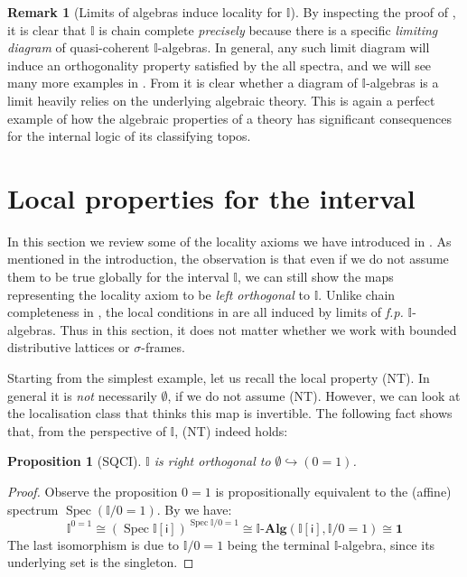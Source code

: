 \documentclass[a4paper,12pt]{amsart}
\newtheorem{proposition}[theorem]{Proposition}
\theoremstyle{definition}
\newtheorem{remark}[theorem]{Remark}
\newcommand{\mb}[1]{\mathbf{#1}}
\newcommand{\mbb}[1]{\mathbb{#1}}
\newcommand{\I}{\mbb I}
\newcommand{\ms}[1]{\mathsf{#1}}
\newcommand{\alg}{\text{-}\mb{Alg}}
\newcommand{\hook}{\hookrightarrow}
\newcommand{\emp}{\emptyset}
\newcommand{\spec}{\operatorname{Spec}}
\begin{document}
\begin{remark}[Limits of algebras induce locality for $\I$]\label{rem:limofalgloc}
  By inspecting the proof of , it is clear that $\I$ is chain complete \emph{precisely} because there is a specific \emph{limiting diagram} of quasi-coherent $\I$-algebras. In general, any such limit diagram will induce an orthogonality property satisfied by the all spectra, and we will see many more examples in . From  it is clear whether a diagram of $\I$-algebras is a limit heavily relies on the underlying algebraic theory. This is again a perfect example of how the algebraic properties of a theory has significant consequences for the internal logic of its classifying topos.
\end{remark}

\section{Local properties for the interval}\label{sec:local}

In this section we review some of the locality axioms we have introduced in . As mentioned in the introduction, the observation is that even if we do not assume them to be true globally for the interval $\I$, we can still show the maps representing the locality axiom to be \emph{left orthogonal} to $\I$.  
Unlike chain completeness in , the local conditions in  are all induced by limits of \emph{f.p.} $\I$-algebras. Thus in this section, it does not matter whether we work with bounded distributive lattices or $\sigma$-frames.

Starting from the simplest example, let us recall the local property (NT). In general it is \emph{not} necessarily $\emp$, if we do not assume (NT). However, we can look at the localisation class that thinks this map is invertible. The following fact shows that, from the perspective of $\I$, (NT) indeed holds:

\begin{proposition}[SQCI]\label{specisnontrivial}
  $\I$ is right orthogonal to $\emp \hook (0 = 1)$.
\end{proposition}
\begin{proof}
  Observe the proposition $0 = 1$ is propositionally equivalent to the (affine) spectrum $\spec(\I/0=1)$. By  we have:
  \[ 
    \I^{0=1} \cong 
    (\spec \I[\ms{i}])^{\spec{\I/0=1}}
    \cong 
    \I\alg(\I[\ms{i}], \I/0=1) 
    \cong 
    \mathbf{1}
  \]
  The last isomorphism is due to $\I/0=1$ being the terminal $\I$-algebra, since its underlying set is the singleton.
\end{proof}
\end{document}
